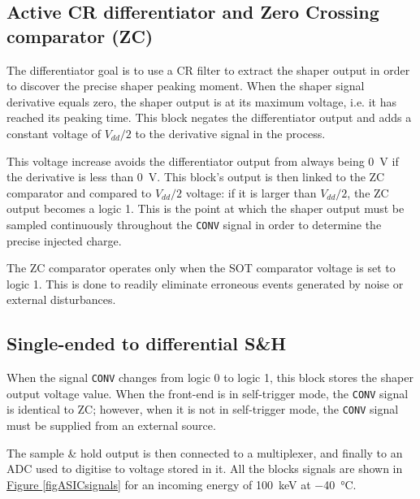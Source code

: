 
\subsection*{Active CR differentiator and Zero Crossing comparator (ZC)}
\label{zeroCrossing}
The differentiator goal is to use a CR filter to extract the shaper output in order to discover the precise shaper peaking moment. When the shaper signal derivative equals zero, the shaper output is at its maximum voltage, i.e. it has reached its peaking time. This block negates the differentiator output and adds a constant voltage of $V_{dd}/2$ to the derivative signal in the process.

This voltage increase avoids the differentiator output from always being \SI{0}{V} if the derivative is less than \SI{0}{V}. This block's output is then linked to the ZC comparator and compared to $V_{dd}/2$ voltage: if it is larger than $V_{dd}/2$, the ZC output becomes a logic 1. This is the point at which the shaper output must be sampled continuously throughout the \texttt{CONV} signal in order to determine the precise injected charge.

\par
The ZC comparator operates only when the SOT comparator voltage is set to logic 1. This is done to readily eliminate erroneous events generated by noise or external disturbances.


\subsection*{Single-ended to differential S\&H}
When the signal \texttt{CONV} changes from logic 0 to logic 1, this block stores the shaper output voltage value. When the front-end is in self-trigger mode, the \texttt{CONV} signal is identical to ZC; however, when it is not in self-trigger mode, the \texttt{CONV} signal must be supplied from an external source.

\par
The sample \& hold output is then connected to a multiplexer, and finally to an ADC used to digitise to voltage stored in it. All the blocks signals are shown in \hyperref[figASICsignals]{Figure \ref{figASICsignals}} for an incoming energy of \SI{100}{\kilo\electronvolt} at \SI{-40}{\celsius}.

